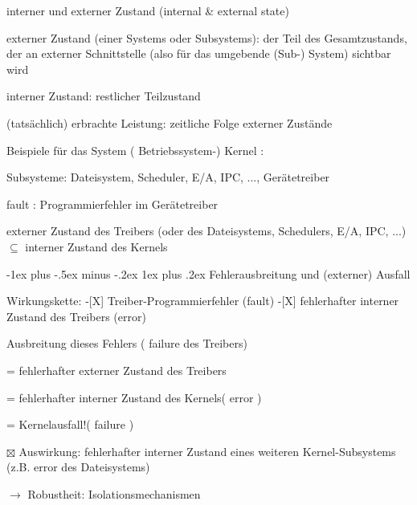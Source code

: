 \documentclass[a4paper]{article}
\makeatletter
\renewcommand{\subsubsection}{\@startsection{subsubsection}{3}{0mm}%
 {-1ex plus -.5ex minus -.2ex}%
 {1ex plus .2ex}%
 {\normalfont\small\bfseries}}
\makeatother
\begin{document}
\begin{multicols}{3}
    \begin{itemize*}
        \item
        interner und externer Zustand (internal \& external state)
        \begin{itemize*}
            \item externer Zustand (einer Systems oder Subsystems): der Teil des Gesamtzustands, der an externer Schnittstelle (also für das umgebende (Sub-) System) sichtbar wird
            \item interner Zustand: restlicher Teilzustand
            \item (tatsächlich) erbrachte Leistung: zeitliche Folge externer Zustände
        \end{itemize*}
        \item
        Beispiele für das System ( Betriebssystem-) Kernel :
        \begin{itemize*}
            \item Subsysteme: Dateisystem, Scheduler, E/A, IPC, ..., Gerätetreiber
            \item fault : Programmierfehler im Gerätetreiber
            \item externer Zustand des Treibers (oder des Dateisystems, Schedulers, E/A, IPC, ...) $\subseteq$ interner Zustand des Kernels
        \end{itemize*}
    \end{itemize*}


    \subsubsection{Fehlerausbreitung und (externer)
        Ausfall}

    \begin{itemize*}
        \item
        Wirkungskette: -{[}X{]} Treiber-Programmierfehler (fault) -{[}X{]}
        fehlerhafter interner Zustand des Treibers (error)
        \begin{itemize*}
            \item Ausbreitung dieses Fehlers ( failure des Treibers)
            \item = fehlerhafter externer Zustand des Treibers
            \item = fehlerhafter interner Zustand des Kernels( error )
            \item = Kernelausfall!( failure )
        \end{itemize*}
        \item[$\boxtimes$]
        Auswirkung: fehlerhafter interner Zustand eines weiteren
        Kernel-Subsystems (z.B. error des Dateisystems)
        \item
        $\rightarrow$ Robustheit: Isolationsmechanismen
        \item
    \end{itemize*}



\end{multicols}
\end{document}
